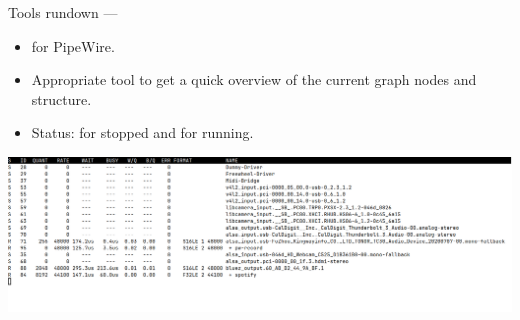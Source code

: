 \begin{frame}{Tools rundown — }
  \begin{itemize}

  \item {} for PipeWire.

  \item Appropriate tool to get a quick overview of the current graph
    nodes and structure.

  \item Status:  for stopped and  for running.

  \end{itemize}

  \begin{center}
    \includegraphics[height=0.5\textheight]{slides/audio-pipewire/pw-top.jpg}\\
  \end{center}
\end{frame}



